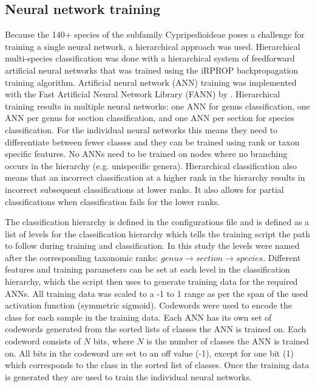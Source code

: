 \documentclass[3p,twocolumn,10pt]{elsarticle}
\begin{document}
\subsection{Neural network training}

Because the 140+ species of the subfamily Cypripedioideae poses a challenge for training a single neural network, a hierarchical approach was used. Hierarchical multi-species classification was done with a hierarchical system of feedforward artificial neural networks that was trained using the iRPROP backpropagation training algorithm. Artificial neural network (ANN) training was implemented with the Fast Artificial Neural Network Library (FANN) by \citet{Nissen2003}. Hierarchical training results in multiple neural networks: one ANN for genus classification, one ANN per genus for section classification, and one ANN per section for species classification. For the individual neural networks this means they need to differentiate between fewer classes and they can be trained using rank or taxon specific features. No ANNs need to be trained on nodes where no branching occurs in the hierarchy (e.g. unispecific genera). Hierarchical classification also means that an incorrect classification at a higher rank in the hierarchy results in incorrect subsequent classifications at lower ranks. It also allows for partial classifications when classification fails for the lower ranks.

The classification hierarchy is defined in the configurations file and is defined as a list of levels for the classification hierarchy which tells the training script the path to follow during training and classification. In this study the levels were named after the corresponding taxonomic ranks: $genus \rightarrow section \rightarrow species$. Different features and training parameters can be set at each level in the classification hierarchy, which the script then uses to generate training data for the required ANNs. All training data was scaled to a -1 to 1 range as per the span of the used activation function (symmetric sigmoid). Codewords were used to encode the class for each sample in the training data. Each ANN has its own set of codewords generated from the sorted lists of classes the ANN is trained on. Each codeword consists of $N$ bits, where $N$ is the number of classes the ANN is trained on. All bits in the codeword are set to an off value (-1), except for one bit (1) which corresponds to the class in the sorted list of classes. Once the training data is generated they are used to train the individual neural networks.
\end{document}
